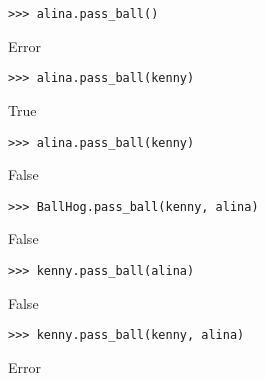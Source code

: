 \begin{blocksection}
\begin{lstlisting}
>>> alina.pass_ball()
\end{lstlisting}
\begin{solution}[.2in]
Error
\end{solution}

\begin{lstlisting}
>>> alina.pass_ball(kenny)
\end{lstlisting}
\begin{solution}[.2in]
True
\end{solution}

\begin{lstlisting}
>>> alina.pass_ball(kenny)
\end{lstlisting}
\begin{solution}[.2in]
False
\end{solution}

\begin{lstlisting}
>>> BallHog.pass_ball(kenny, alina)
\end{lstlisting}
\begin{solution}[.2in]
False
\end{solution}

\begin{lstlisting}
>>> kenny.pass_ball(alina)
\end{lstlisting}
\begin{solution}[.2in]
False
\end{solution}

\begin{lstlisting}
>>> kenny.pass_ball(kenny, alina)
\end{lstlisting}
\begin{solution}[.2in]
Error
\end{solution}
\end{blocksection}
